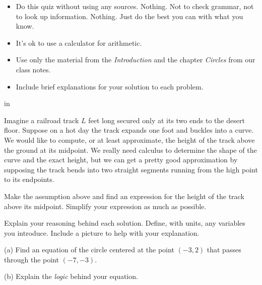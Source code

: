 \documentclass{ximera}
\newcommand{\pskip}{\vskip 0.1 in}
\begin{document}
\begin{itemize}

\item{Do this quiz without using any sources. Nothing. Not to check grammar, not to look up information. Nothing. Just do the best you can with what you know.}

\item{It's ok to use a calculator for arithmetic.}

\item{Use only the material from the \emph{Introduction} and the chapter \emph{Circles} from our class notes.}

\item{Include brief explanations for your solution to each problem.}

\end{itemize}


\pskip

\begin{question}  \label{Q:9444433331350}
Imagine a railroad track $L$ feet long secured only at its two ends to the desert floor. Suppose on a hot day the track expands one foot and buckles into a curve. We would like to compute, or at least approximate, the height of the track above the ground at its midpoint. We really need calculus to determine the shape of the curve and the exact height, but we can get a pretty good approximation by supposing the track bends into two straight segments running from the high point to its endpoints.

Make the assumption above and find an expression for the height of the track above its midpoint. Simplify your expression as much as possible. 

Explain your reasoning behind each solution. Define, with units, any variables you introduce. Include a picture to help with your explanation.

\end{question}


\begin{question}  \label{Q8dsf8r3tg;lyhg}
(a) Find an equation of the circle centered at the point $(-3,2)$ that passes through the point $(-7,-3)$. 

(b) Explain the \emph{logic} behind your equation. 
\end{question}


\end{document}

